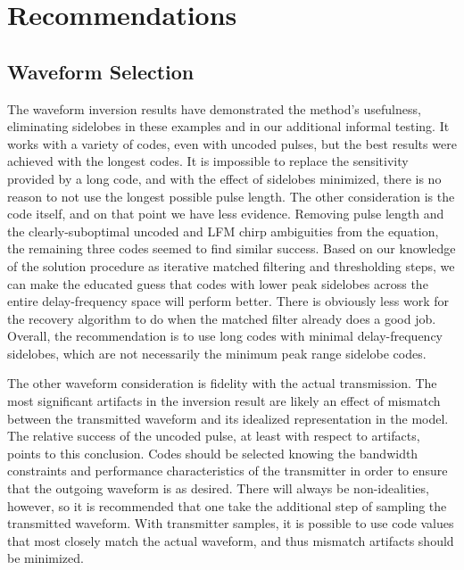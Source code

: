 \section{Recommendations}
\subsection{Waveform Selection}
The waveform inversion results have demonstrated the method's usefulness, eliminating sidelobes in these examples and in our additional informal testing. It works with a variety of codes, even with uncoded pulses, but the best results were achieved with the longest codes. It is impossible to replace the sensitivity provided by a long code, and with the effect of sidelobes minimized, there is no reason to not use the longest possible pulse length. The other consideration is the code itself, and on that point we have less evidence. Removing pulse length and the clearly-suboptimal uncoded and LFM chirp ambiguities from the equation, the remaining three codes seemed to find similar success. Based on our knowledge of the solution procedure as iterative matched filtering and thresholding steps, we can make the educated guess that codes with lower peak sidelobes across the entire delay-frequency space will perform better. There is obviously less work for the recovery algorithm to do when the matched filter already does a good job. Overall, the recommendation is to use long codes with minimal delay-frequency sidelobes, which are not necessarily the minimum peak range sidelobe codes.

The other waveform consideration is fidelity with the actual transmission. The most significant artifacts in the inversion result are likely an effect of mismatch between the transmitted waveform and its idealized representation in the model. The relative success of the uncoded pulse, at least with respect to artifacts, points to this conclusion. Codes should be selected knowing the bandwidth constraints and performance characteristics of the transmitter in order to ensure that the outgoing waveform is as desired. There will always be non-idealities, however, so it is recommended that one take the additional step of sampling the transmitted waveform. With transmitter samples, it is possible to use code values that most closely match the actual waveform, and thus mismatch artifacts should be minimized.

